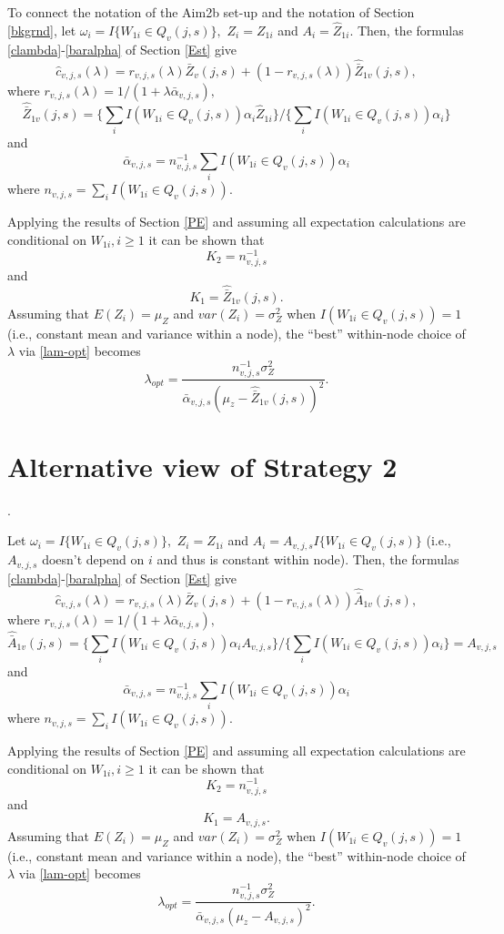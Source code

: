 \documentclass[12pt]{article}
\begin{document}
To connect the notation of the Aim2b set-up and the notation of
Section \ref{bkgrnd}, let $\omega_i = I\{ W_{1i} \in Q_{v}(j,s) \},$
$Z_i = Z_{1i}$ and $A_i = \hat Z_{1i}$. Then, the formulas
\eqref{clambda}-\eqref{baralpha} of Section \ref{Est} give
 \[
\widehat{c}_{v,j,s}(\lambda) =
r_{v,j,s}(\lambda) \bar{Z}_v(j,s) + (1-r_{v,j,s}(\lambda)) \hat{\bar{Z}}_{1v}(j,s),
\]
where $r_{v,j,s}(\lambda) = 1/(1 + \lambda \bar{\alpha}_{v,j,s}),$
\[
\hat{\bar{Z}}_{1v}(j,s) =
\{ \sum_i I(W_{1i} \in Q_{v}(j,s)) \alpha_i  \hat{Z}_{1i} \}
/ \{ \sum_i I(W_{1i} \in Q_{v}(j,s)) \alpha_i \}
\]
and
\[
\bar{\alpha}_{v,j,s} = n^{-1}_{v,j,s} \sum_i I(W_{1i} \in Q_{v}(j,s))
\alpha_i
\]
where $n_{v,j,s} =  \sum_i I( W_{1i} \in Q_{v}(j,s) ).$

Applying the results of Section \ref{PE} and assuming all expectation
calculations are conditional on $W_{1i}, i \geq 1$ it can be shown that
\[
K_2 = n^{-1}_{v,j,s}
\]
and
\[
K_1 = \hat{\bar{Z}}_{1v}(j,s).
\]
Assuming that $E(Z_i) = \mu_Z$ and $var(Z_i) = \sigma^2_Z$ when $I(
W_{1i} \in Q_{v}(j,s) ) =1$ (i.e., constant mean and variance within a
node), the ``best'' within-node choice of $\lambda$ via
\eqref{lam-opt} becomes
\begin{equation}
\lambda_{opt} = \frac{n^{-1}_{v,j,s} \sigma^2_Z}{ \bar{\alpha}_{v,j,s} (\mu_z -  \hat{\bar{Z}}_{1v}(j,s))^2}.
\end{equation}




\section{Alternative view of Strategy 2}.

Let $\omega_i = I\{ W_{1i} \in Q_{v}(j,s) \},$ $Z_i = Z_{1i}$ and $A_i
= A_{v,j,s} I\{ W_{1i} \in Q_{v}(j,s) \}$ (i.e., $A_{v,j,s}$ doesn't
depend on $i$ and thus is constant within node).  Then, the formulas
\eqref{clambda}-\eqref{baralpha} of Section \ref{Est} give
 \[
\widehat{c}_{v,j,s}(\lambda) = r_{v,j,s}(\lambda) \bar{Z}_v(j,s) +
(1-r_{v,j,s}(\lambda)) \hat{\bar{A}}_{1v}(j,s),
\]
where $r_{v,j,s}(\lambda) = 1/(1 + \lambda \bar{\alpha}_{v,j,s}),$
\[
\hat{\bar{A}}_{1v}(j,s) =
\{ \sum_i I(W_{1i} \in Q_{v}(j,s)) \alpha_i  A_{v,j,s}  \}
/ \{ \sum_i I(W_{1i} \in Q_{v}(j,s)) \alpha_i \} = A_{v,j,s}
\]
and
\[
\bar{\alpha}_{v,j,s} =  n^{-1}_{v,j,s} \sum_i I(W_{1i} \in Q_{v}(j,s)) \alpha_i
\]
where $n_{v,j,s} =  \sum_i I( W_{1i} \in Q_{v}(j,s) ).$

Applying the results of Section \ref{PE} and assuming all expectation
calculations are conditional on $W_{1i}, i \geq 1$ it can be shown that
\[
K_2 = n^{-1}_{v,j,s}
\]
and
\[
K_1 = A_{v,j,s}.
\]
Assuming that $E(Z_i) = \mu_Z$ and $var(Z_i) = \sigma^2_Z$ when $I(
W_{1i} \in Q_{v}(j,s) ) =1$ (i.e., constant mean and variance within a
node), the ``best'' within-node choice of $\lambda$ via
\eqref{lam-opt} becomes
\[
\lambda_{opt} = \frac{n^{-1}_{v,j,s} \sigma^2_Z}{ \bar{\alpha}_{v,j,s} (\mu_z -  A_{v,j,s})^2}.
\]
\end{document}
